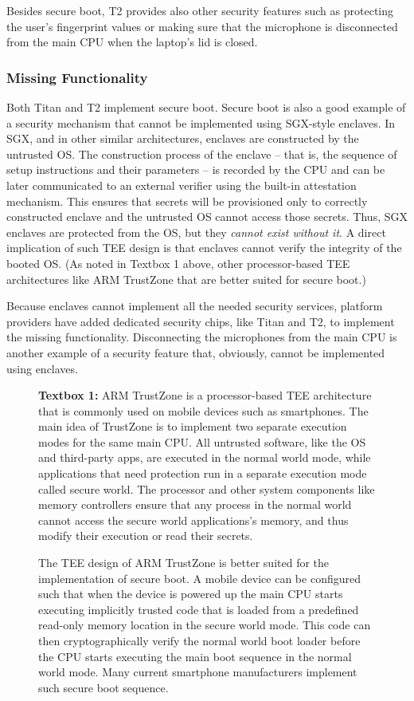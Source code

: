 Besides secure boot, T2 provides also other security features such as protecting the user's fingerprint values or making sure that the microphone is disconnected from the main CPU when the laptop's lid is closed. 
 
 
\subsubsection*{Missing Functionality}
  
Both Titan and T2 implement secure boot. Secure boot is also a good example of a security mechanism that cannot be implemented using SGX-style enclaves. 
%
In SGX, and in other similar architectures, enclaves are constructed by the untrusted OS. The construction process of the enclave -- that is, the sequence of setup instructions and their parameters -- is recorded by the CPU and can be later communicated to an external verifier using the built-in attestation mechanism. This ensures that secrets will be provisioned only to correctly constructed enclave and the untrusted OS cannot access those secrets. Thus, SGX enclaves are protected from the OS, but they \emph{cannot exist without it}. A direct implication of such TEE design is that enclaves cannot verify the integrity of the booted OS. (As noted in Textbox 1 above, other processor-based TEE architectures like ARM TrustZone that are better suited for secure boot.)

Because enclaves cannot implement all the needed security services, platform providers have added dedicated security chips, like Titan and T2, to implement the missing functionality. Disconnecting the microphones from the main CPU is another example of a security feature that, obviously, cannot be implemented using enclaves.

\begin{figure}
	\begin{tcolorbox}
	\textbf{Textbox 1:} 
	ARM TrustZone is a processor-based TEE architecture that is commonly used on mobile devices such as smartphones. The main idea of TrustZone is to implement two separate execution modes for the same main CPU. All untrusted software, like the OS and third-party apps, are executed in the normal world mode, while applications that need protection run in a separate execution mode called secure world. The processor and other system components like memory controllers ensure that any process in the normal world cannot access the secure world applications’s memory, and thus modify their execution or read their secrets.
	
	The TEE design of ARM TrustZone is better suited for the implementation of secure boot. A mobile device can be configured such that when the device is powered up the main CPU starts executing implicitly trusted code that is loaded from a predefined read-only memory location in the secure world mode. This code can then cryptographically verify the normal world boot loader before the CPU starts executing the main boot sequence in the normal world mode. Many current smartphone manufacturers implement such secure boot sequence.
	\end{tcolorbox}
\end{figure}  


